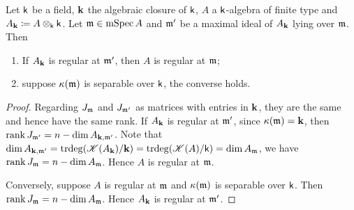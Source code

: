     \begin{proposition}\label{prop: regularity under base field extension}
        Let \({\mathsf{k}}\) be a field, \({\mathbf{k}}\) the algebraic closure of \({\mathsf{k}}\), \(A\) a \({\mathsf{k}}\)-algebra of finite type and \(A_{\mathbf{k}} \coloneqq A \otimes_{{\mathsf{k}}} {\mathsf{k}}\).
        Let \({\mathfrak{m}} \in \operatorname{mSpec} A\) and \({\mathfrak{m}}'\) be a maximal ideal of \(A_{\mathbf{k}}\) lying over \({\mathfrak{m}}\).
        Then 
        \begin{enumerate}
            \item If \(A_{\mathbf{k}}\) is regular at \({\mathfrak{m}}'\), then \(A\) is regular at \({\mathfrak{m}}\);
            \item suppose \({\kappa}({\mathfrak{m}})\) is separable over \({\mathsf{k}}\), the converse holds.
        \end{enumerate}
    \end{proposition}
    \begin{proof}
        Regarding \(J_{\mathfrak{m}}\) and \(J_{{\mathfrak{m}}'}\) as matrices with entries in \({\mathbf{k}}\), they are the same and hence have the same rank.
        If \(A_{\mathbf{k}}\) is regular at \({\mathfrak{m}}'\), since \({\kappa}({\mathfrak{m}}) = {\mathbf{k}}\), then \(\operatorname{rank} J_{{\mathfrak{m}}'} = n - \dim A_{{\mathbf{k}},{\mathfrak{m}}'}\).
        Note that \(\dim A_{{\mathbf{k}},{\mathfrak{m}}'} = \operatorname{trdeg}({\mathscr{K}}(A_{\mathbf{k}})/{\mathbf{k}}) = \operatorname{trdeg}({\mathscr{K}}(A)/{\mathsf{k}}) = \dim A_{\mathfrak{m}}\), we have \(\operatorname{rank} J_{{\mathfrak{m}}} = n - \dim A_{\mathfrak{m}}\).
        Hence \(A\) is regular at \({\mathfrak{m}}\).

        Conversely, suppose \(A\) is regular at \({\mathfrak{m}}\) and \({\kappa}({\mathfrak{m}})\) is separable over \({\mathsf{k}}\).
        Then \(\operatorname{rank} J_{\mathfrak{m}} = n - \dim A_{\mathfrak{m}}\).
        Hence \(A_{\mathbf{k}}\) is regular at \({\mathfrak{m}}'\).
    \end{proof}

